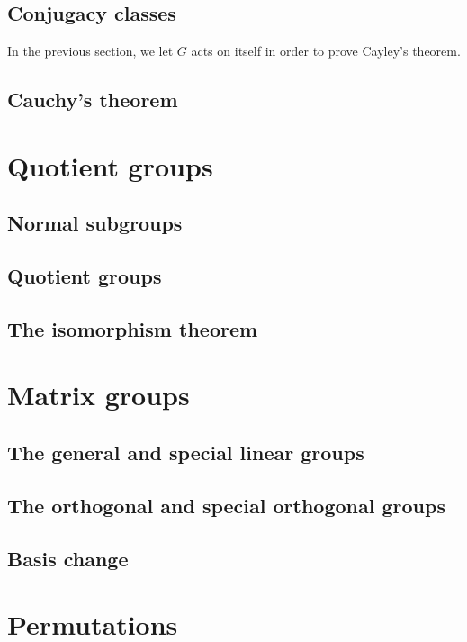 \documentclass[main.tex]{subfiles}
\begin{document}
			\subsection{Conjugacy classes}
				In the previous section, we let $G$ acts on itself in order to prove Cayley's theorem.
			\subsection{Cauchy's theorem}
				
		\section{Quotient groups}
			\subsection{Normal subgroups}
			
			\subsection{Quotient groups}
			
			\subsection{The isomorphism theorem}
			
		\section{Matrix groups}
			\subsection{The general and special linear groups}
			
			\subsection{The orthogonal and special orthogonal groups}
			
			\subsection{Basis change}
			
		\section{Permutations}
\end{document}
